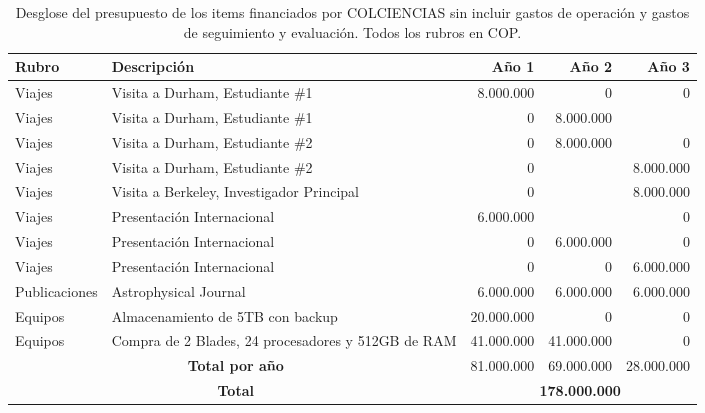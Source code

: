 \begin{table}[h]
\begin{center}
\begin{tabular}{|l|p{5.5cm}|r|r|r|}\hline
{\bf Rubro}	&{\bf Descripción}	& {\bf Año 1}	& {\bf Año 2}	& {\bf Año 3}\\\hline
Viajes	&Visita a Durham, Estudiante \#1	& 8.000.000	&	0&0\\\hline
Viajes	&Visita a Durham, Estudiante \#1	&0	& 8.000.000 &\\\hline
Viajes	&Visita a Durham, Estudiante \#2	&0	&	8.000.000 &0\\\hline
Viajes	&Visita a Durham, Estudiante \#2	&0	&	 & 8.000.000\\\hline
Viajes	&Visita a Berkeley, Investigador Principal	&0	&	 & 8.000.000\\\hline
Viajes	&Presentación Internacional	& 6.000.000	&	&0\\\hline
Viajes	&Presentación Internacional    &0	&6.000.000	&0\\\hline
Viajes	&Presentación Internacional    &0	&0	&6.000.000\\\hline
Publicaciones	&Astrophysical Journal	&6.000.000	& 6.000.000	&6.000.000\\\hline
Equipos	&Almacenamiento de 5TB con backup 	&20.000.000	&0	&0\\\hline
Equipos	&Compra de 2 Blades, 24 procesadores y 512GB de RAM 	&41.000.000	&41.000.000	&0\\\hline
\multicolumn{2}{|c|}{{\bf Total por año}}	 & 81.000.000	&69.000.000	&28.000.000 \\\hline
\multicolumn{2}{|c|}{\bf Total } & \multicolumn{3}{|c|}{{\bf 178.000.000}}\\\hline
\end{tabular} 
\caption{Desglose del presupuesto de los items financiados por COLCIENCIAS sin incluir gastos de 
operaci\'on y gastos de seguimiento y evaluaci\'on. Todos los rubros en COP.}
\end{center}
\label{Resumen Presupuesto Colciencias}
\end{table}


